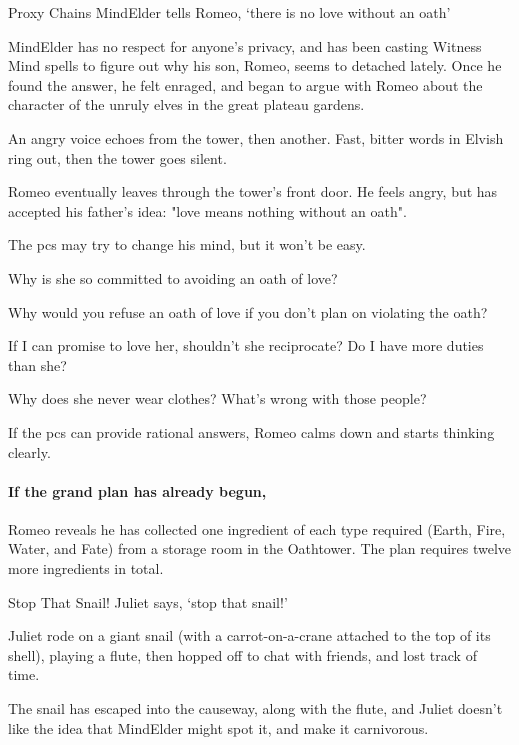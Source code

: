 {Proxy Chains}%
{MindElder tells Romeo, `there is no love without an oath'}%

\Gls{MindElder} has no respect for anyone's privacy, and has been casting Witness Mind spells to figure out why his son, Romeo, seems to detached lately.
Once he found the answer, he felt enraged, and began to argue with Romeo about the character of the unruly elves in the great plateau gardens.


\begin{boxtext}
  An angry voice echoes from the tower, then another.
  Fast, bitter words in Elvish ring out, then the tower goes silent.
\end{boxtext}

Romeo eventually leaves through the tower's front door.
He feels angry, but has accepted his father's idea: "love means nothing without an oath".

The \glspl{pc} may try to change his mind, but it won't be easy.

\begin{speechtext}
  Why is she so committed to avoiding an oath of love?

  Why would you refuse an oath of love if you don't plan on violating the oath?

  If I can promise to love her, shouldn't she reciprocate?
  Do I have more duties than she?

  Why does she never wear clothes?
  What's wrong with those people?
\end{speechtext}

If the \glspl{pc} can provide rational answers, Romeo calms down and starts thinking clearly.

\paragraph{If the grand plan has already begun,}
Romeo reveals he has collected one \gls{ingredient} of each type required (Earth, Fire, Water, and Fate) from a storage room in the Oathtower.
The plan requires twelve more \glspl{ingredient} in total.

{Stop That Snail!}%
{Juliet says, `stop that snail!'}%

Juliet rode on a giant snail (with a carrot-on-a-crane attached to the top of its shell), playing a flute, then hopped off to chat with friends, and lost track of time.

The snail has escaped into the causeway, along with the flute, and Juliet doesn't like the idea that \gls{MindElder} might spot it, and make it carnivorous.

